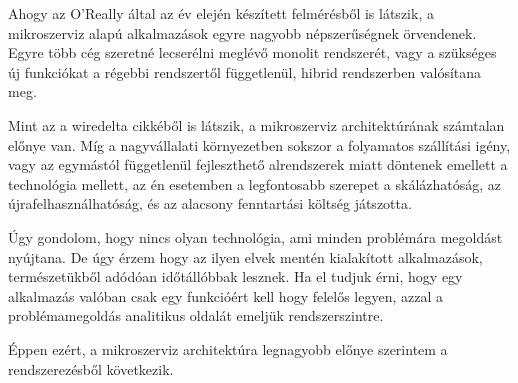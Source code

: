 Ahogy az \foreignlanguage{british}{O'Really} által az év elején készített felmérésből \cite{OReally} is látszik, a mikroszerviz alapú alkalmazások egyre nagyobb népszerűségnek örvendenek. Egyre több cég szeretné lecserélni meglévő monolit rendszerét, vagy a szükséges új funkciókat a régebbi rendszertől függetlenül, hibrid rendszerben valósítana meg.

Mint az a \foreignlanguage{british}{wiredelta} cikkéből \cite{wiredelta} is látszik, a mikroszerviz architektúrának számtalan előnye van. Míg a nagyvállalati környezetben sokszor a folyamatos szállítási igény, vagy az egymástól függetlenül fejleszthető alrendszerek miatt döntenek emellett a technológia mellett, az én esetemben a legfontosabb szerepet a skálázhatóság, az újrafelhasználhatóság, és  az alacsony fenntartási költség játszotta.

Úgy gondolom, hogy nincs olyan technológia, ami minden problémára megoldást nyújtana. De úgy érzem hogy az ilyen elvek mentén kialakított alkalmazások, természetükből adódóan időtállóbbak lesznek. Ha el tudjuk érni, hogy egy alkalmazás valóban csak egy funkcióért kell hogy felelős legyen, azzal a problémamegoldás analitikus oldalát  emeljük rendszerszintre. 

Éppen ezért, a mikroszerviz architektúra legnagyobb előnye szerintem a rendszerezésből következik.